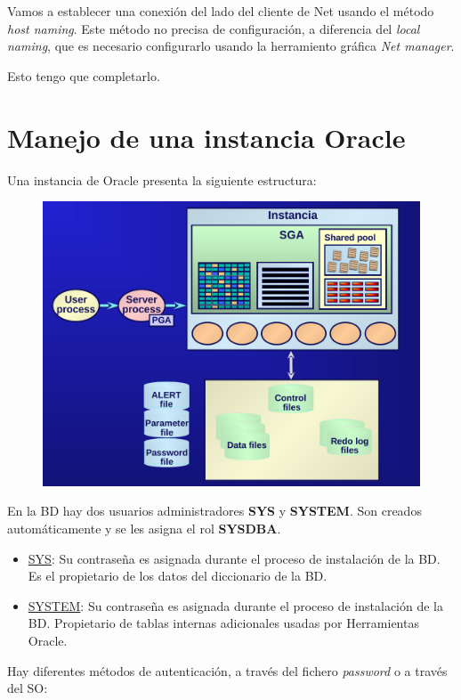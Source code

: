 Vamos a establecer una conexión del lado del cliente de Net usando el método \textit{host naming}. Este método no precisa de configuración, a diferencia del \textit{local naming}, que es necesario configurarlo usando la herramiento gráfica \textit{Net manager}.

Esto tengo que completarlo.

\section{Manejo de una instancia Oracle}

Una instancia de Oracle presenta la siguiente estructura: 

\begin{figure}[H]
  \center
  \includegraphics[scale=0.3]{img/p13.png}
\end{figure}

En la BD hay dos usuarios administradores \textbf{SYS} y \textbf{SYSTEM}. Son creados automáticamente y se les asigna el rol \textbf{SYSDBA}.
\begin{itemize}
\item \underline{SYS}: Su contraseña es asignada durante el proceso de instalación de la BD. Es el propietario de los datos del diccionario de la BD.
\item \underline{SYSTEM}: Su contraseña es asignada durante el proceso de instalación de la BD. Propietario de tablas internas adicionales usadas por Herramientas Oracle.
\end{itemize}

Hay diferentes métodos de autenticación, a través del fichero \textit{password} o a través del SO:

